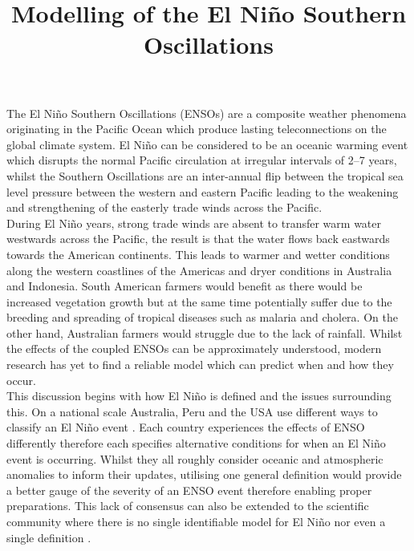 \documentclass[12pt, onecolumn]{revtex4}    %
\begin{document}
                     

\title{Modelling of the El Ni\~{n}o Southern Oscillations} 

\maketitle
\thispagestyle{plain} %

The El Ni\~{n}o Southern Oscillations (ENSOs) are a composite weather phenomena originating in the Pacific Ocean which produce lasting teleconnections on the global climate system. El Ni\~{n}o can be considered to be an oceanic warming event which disrupts the normal Pacific circulation at irregular intervals of 2--7 years, whilst the Southern Oscillations are an inter-annual flip between the tropical sea level pressure between the western and eastern Pacific leading to the weakening and strengthening of the easterly trade winds across the Pacific. \\

During El Ni\~{n}o years, strong trade winds are absent to transfer warm water westwards across the Pacific, the result is that the water flows back eastwards towards the American continents. This leads to warmer and wetter conditions along the western coastlines of the Americas and dryer conditions in Australia and Indonesia. South American farmers would benefit as there would be increased vegetation growth but at the same time potentially suffer due to the breeding and spreading of tropical diseases such as malaria and cholera. On the other hand, Australian farmers would struggle due to the lack of rainfall. Whilst the effects of the coupled ENSOs can be approximately understood, modern research has yet to find a reliable model which can predict when and how they occur. \\

This discussion begins with how El Ni\~{n}o is defined and the issues surrounding this. On a national scale Australia, Peru and the USA use different ways to classify an El Ni\~{n}o event \citep{doi:10.1175/BAMS-D-16-0009.1}. Each country experiences the effects of ENSO differently therefore each specifies alternative conditions for when an El Ni\~{n}o event is occurring. Whilst they all roughly consider oceanic and atmospheric anomalies to inform their updates, utilising one general definition would provide a better gauge of the severity of an ENSO event therefore enabling proper preparations. This lack of consensus can also be extended to the scientific community where there is no single identifiable model for El Ni\~{n}o nor even a single definition \citep{1997BAMS...78.2771T}. \\
\end{document}
